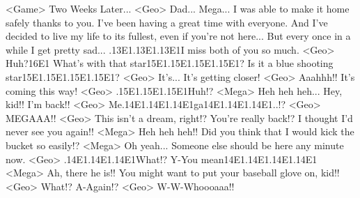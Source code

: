 <Game> Two Weeks Later... 
<Geo> Dad... Mega... 
I was able to make it home safely thanks to you. 
I've been having a great time with everyone. 
And I've decided to live my life to its fullest, even if you're not here... 
But every once in a while I get pretty sad... 
.{13}{E1}.{13}{E1}.{13}{E1}I miss both of you so much. 
<Geo> Huh?{16}{E1} What's with that star{15}{E1}.{15}{E1}.{15}{E1}.{15}{E1}? 
Is it a blue shooting star{15}{E1}.{15}{E1}.{15}{E1}.{15}{E1}? 
<Geo> It's... 
It's getting closer! 
<Geo> Aaahhh!! It's coming this way! 
<Geo> .{15}{E1}.{15}{E1}.{15}{E1}Huh!? 
<Mega> Heh heh heh... 
Hey, kid!! I'm back!! 
<Geo> Me.{14}{E1}.{14}{E1}.{14}{E1}ga{14}{E1}.{14}{E1}.{14}{E1}..!? 
<Geo> MEGAAA!! 
<Geo> This isn't a dream, right!? 
You're really back!? 
I thought I'd never see you again!! 
<Mega> Heh heh heh!! 
Did you think that I would kick the bucket so easily!? 
<Mega> Oh yeah... Someone else should be here any minute now. 
<Geo> .{14}{E1}.{14}{E1}.{14}{E1}What!? 
Y-You mean{14}{E1}.{14}{E1}.{14}{E1}.{14}{E1} 
<Mega> Ah, there he is!! 
You might want to put your baseball glove on, kid!! 
<Geo> What!? A-Again!? 
<Geo> W-W-Whoooaaa!! 
